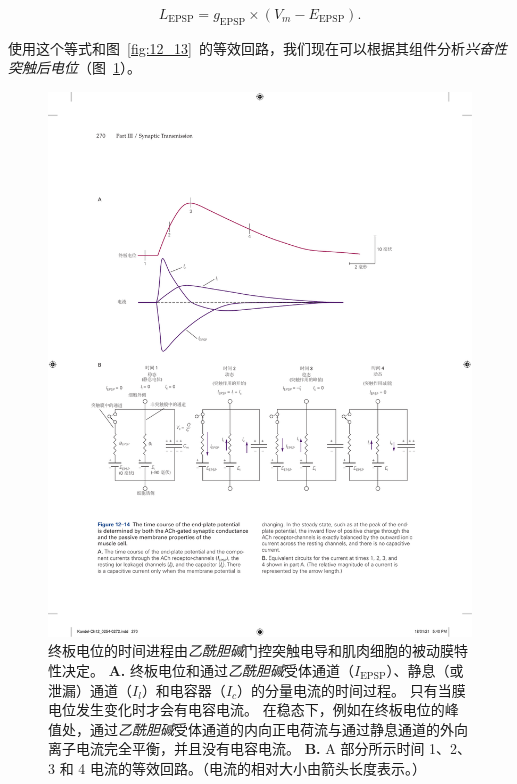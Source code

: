 \begin{equation}\label{excitatory_potential}
	L_{\text{EPSP}} = g_{\text{EPSP}} \times (V_m - E_{\text{EPSP}}).
\end{equation}


使用这个等式和图~\ref{fig:12_13}~的等效回路，我们现在可以根据其组件分析\textit{兴奋性突触后电位}（图~\ref{fig:12_14}）。


\begin{figure}[htbp]
	\centering
	\includegraphics[width=1.0\linewidth]{chap12/fig_12_14}
	\caption{终板电位的时间进程由\textit{乙酰胆碱}门控突触电导和肌肉细胞的被动膜特性决定。
		\textbf{A.} 终板电位和通过\textit{乙酰胆碱}受体通道（$I_{\text{EPSP}}$）、静息（或泄漏）通道（$ I_l $）和电容器（$ I_c $）的分量电流的时间过程。
		只有当膜电位发生变化时才会有电容电流。
		在稳态下，例如在终板电位的峰值处，通过\textit{乙酰胆碱}受体通道的内向正电荷流与通过静息通道的外向离子电流完全平衡，并且没有电容电流。
		\textbf{B.} A 部分所示时间 1、2、3 和 4 电流的等效回路。（电流的相对大小由箭头长度表示。）}
	\label{fig:12_14}
\end{figure}


